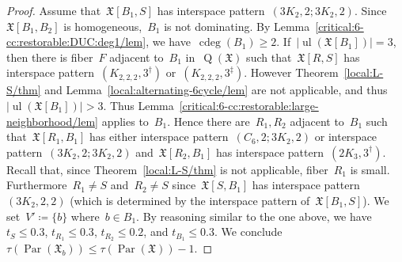 \documentclass[english,a4paper]{article}
\theoremstyle{plain}
\theoremstyle{definition}
\newcommand{\coherentConfig}{\ensuremath{\mathfrak{X}}}
\newcommand{\interspace}[2]{\ensuremath{\coherentConfig[#1,#2]}}
\newcommand{\inducedCC}[1]{\ensuremath{\coherentConfig[#1]}}
\DeclareMathOperator*{\ul}{ul}
\DeclareMathOperator*{\Quotient}{Q}
\newcommand{\quotientGraph}[1]{\ensuremath{\Quotient(#1)}}
\DeclareMathOperator{\ColorDeg}{cdeg}
\newcommand{\colorDeg}[1]{\ensuremath{\ColorDeg\left(#1\right)}}
\DeclareMathOperator{\parameters}{Par}
\newcommand{\ipsixMatchingTwice}        {\ensuremath{(\disjointCliques{3}{2},2,2)}}
\newcommand{\ipsixMatchingMatching}     {\ensuremath{(\disjointCliques{3}{2},2;\disjointCliques{3}{2},2)}}
\newcommand{\ipsixMatchingAndCycle}     {\ensuremath{(\cycle{6},2;\disjointCliques{3}{2},2)}}
\newcommand{\ipsixTriangle}               {\ensuremath{(\disjointCliques{2}{3},3^\dag)}}
\newcommand{\ipsixMatchingComplement} {\ensuremath{(\clique{2,2,2},3^\dag)}}
\newcommand{\ipsixMatchingComplementD}{\ensuremath{(\clique{2,2,2},3^\ddag)}}
\newcommand{\clique}[1]{\ensuremath{K_{#1}}}
\newcommand{\cycle}[1]{\ensuremath{C_{#1}}}
\newcommand{\disjointCliques}[2]{\ensuremath{#1 \clique{#2}}}
\begin{document}
\begin{proof}
    Assume that~$\interspace{B_1}{S}$ has interspace pattern~$\ipsixMatchingMatching$.
    Since~$\interspace{B_1}{B_2}$ is homogeneous,~$B_1$ is not dominating.
    By Lemma~\ref{critical:6-cc:restorable:DUC:deg1/lem}, we have~$\colorDeg{B_1} \geq 2$.
    If~$|\ul(\inducedCC{B_1})| = 3$, then there is fiber~$F$ adjacent to~$B_1$ in~$\quotientGraph{\coherentConfig}$ such that~$\interspace{R}{S}$ has interspace pattern~$\ipsixMatchingComplement$ or~$\ipsixMatchingComplementD$.
    However Theorem~\ref{local:L-S/thm} and Lemma~\ref{local:alternating-6cycle/lem} are not applicable, and thus~$|\ul(\inducedCC{B_1})| >3$.
    Thus Lemma~\ref{critical:6-cc:restorable:large-neighborhood/lem} applies to~$B_1$.
    Hence there are~$R_1,R_2$ adjacent to~$B_1$ such that~$\interspace{R_1}{B_1}$ has either interspace pattern~$\ipsixMatchingAndCycle$ or interspace pattern~$\ipsixMatchingMatching$ and~$\interspace{R_2}{B_1}$ has interspace pattern~$\ipsixTriangle$.
    Recall that, since Theorem~\ref{local:L-S/thm} is not applicable, fiber~$R_1$ is small.
    Furthermore~$R_1 \neq S$ and~$R_2 \neq S$ since~$\interspace{S}{B_1}$ has interspace pattern~$\ipsixMatchingTwice$ (which is determined by the interspace pattern of~$\interspace{B_1}{S}$).
    We set~$V' \coloneqq \{b\}$ where~$b \in B_1$.
    By reasoning similar to the one above, we have~$t_S \leq 0.3$, $t_{R_1} \leq 0.3$, $t_{R_2} \leq 0.2$, and $t_{B_1} \leq 0.3$.
    We conclude~$\tau(\parameters(\coherentConfig_b)) \leq \tau(\parameters(\coherentConfig))- 1$.


\end{proof}
\end{document}
